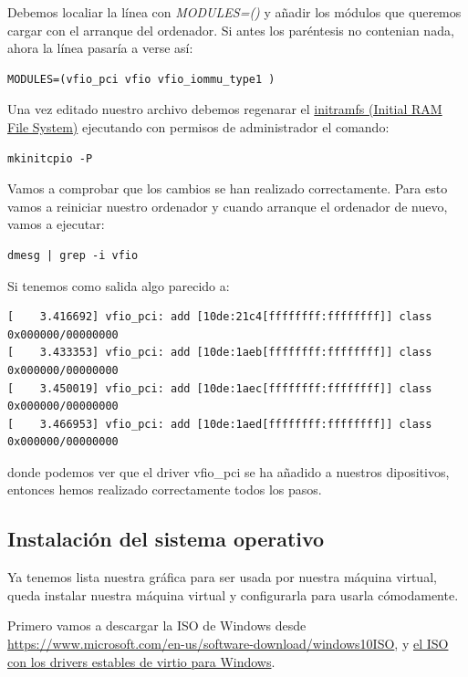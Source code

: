 \documentclass[12pt]{article}
\begin{document}
Debemos localiar la línea con \emph{MODULES=()} y añadir los módulos que queremos cargar con el arranque del ordenador. Si antes los paréntesis no contenian nada, ahora la línea pasaría a verse así:

\begin{verbatim}
MODULES=(vfio_pci vfio vfio_iommu_type1 )
\end{verbatim}

Una vez editado nuestro archivo debemos regenarar el \href{https://en.wikipedia.org/wiki/Initial\_ramdisk}{initramfs (Initial RAM File System)} ejecutando con permisos de administrador el comando:

\begin{verbatim}
mkinitcpio -P
\end{verbatim}

Vamos a comprobar que los cambios se han realizado correctamente. Para esto vamos a reiniciar nuestro ordenador y cuando arranque el ordenador de nuevo, vamos a ejecutar:

\begin{verbatim}
dmesg | grep -i vfio
\end{verbatim}

Si tenemos como salida algo parecido a:

\begin{lstlisting}[basicstyle=\scriptsize\ttfamily]
[    3.416692] vfio_pci: add [10de:21c4[ffffffff:ffffffff]] class 0x000000/00000000
[    3.433353] vfio_pci: add [10de:1aeb[ffffffff:ffffffff]] class 0x000000/00000000
[    3.450019] vfio_pci: add [10de:1aec[ffffffff:ffffffff]] class 0x000000/00000000
[    3.466953] vfio_pci: add [10de:1aed[ffffffff:ffffffff]] class 0x000000/00000000
\end{lstlisting}

donde podemos ver que el driver vfio\_pci se ha añadido a nuestros dipositivos, entonces hemos realizado correctamente todos los pasos.

\subsection{Instalación del sistema operativo}

Ya tenemos lista nuestra gráfica para ser usada por nuestra máquina virtual, queda instalar nuestra máquina virtual y configurarla para usarla cómodamente.

Primero vamos a descargar la ISO de Windows desde \href{https://www.microsoft.com/en-us/software-download/windows10ISO}{https://www.microsoft.com/en-us/software-download/windows10ISO}, y \href{https://github.com/virtio-win/virtio-win-pkg-scripts/blob/master/README.md}{el ISO con los drivers estables de virtio para Windows}.
\end{document}
